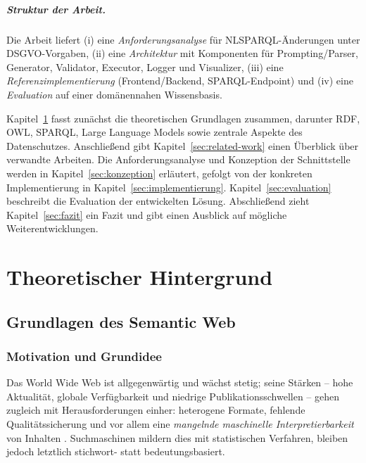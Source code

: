 \paragraph{Struktur der Arbeit.}
Die Arbeit liefert (i) eine \emph{Anforderungsanalyse} für NL{\textrightarrow}SPARQL-Änderungen unter DSGVO-Vorgaben,  
(ii) eine \emph{Architektur} mit Komponenten für Prompting/Parser, Generator, Validator, Executor, Logger und Visualizer,  
(iii) eine \emph{Referenzimplementierung} (Frontend/Backend, SPARQL-Endpoint)  
und (iv) eine \emph{Evaluation} auf einer domänennahen Wissensbasis.

Kapitel~\ref{sec:theorie} fasst zunächst die theoretischen Grundlagen zusammen, darunter RDF, OWL, SPARQL, Large Language Models sowie zentrale Aspekte des Datenschutzes. Anschließend gibt Kapitel~\ref{sec:related-work} einen Überblick über verwandte Arbeiten. Die Anforderungsanalyse und Konzeption der Schnittstelle werden in Kapitel~\ref{sec:konzeption} erläutert, gefolgt von der konkreten Implementierung in Kapitel~\ref{sec:implementierung}. Kapitel~\ref{sec:evaluation} beschreibt die Evaluation der entwickelten Lösung. Abschließend zieht Kapitel~\ref{sec:fazit} ein Fazit und gibt einen Ausblick auf mögliche Weiterentwicklungen.








\chapter{Theoretischer Hintergrund}
\label{sec:theorie}

\section{Grundlagen des Semantic Web}
\label{sec:grundlagen-semantic-web}

\subsection{Motivation und Grundidee}

Das World Wide Web ist allgegenwärtig und wächst stetig; seine Stärken -- hohe Aktualität, globale Verfügbarkeit und niedrige Publikationsschwellen -- gehen zugleich mit Herausforderungen einher: heterogene Formate, fehlende Qualitätssicherung und vor allem eine \emph{mangelnde maschinelle Interpretierbarkeit} von Inhalten \cite{Hitzler}. Suchmaschinen mildern dies mit statistischen Verfahren, bleiben jedoch letztlich stichwort- statt bedeutungsbasiert. 

